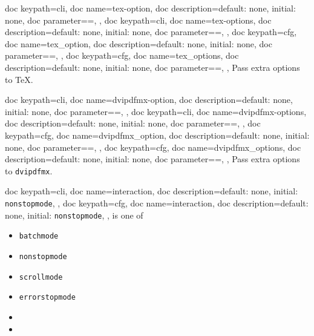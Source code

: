 \documentclass[a4paper, 11pt]{scrartcl}
\let\TeXold\TeX
\renewcommand\TeX{\TeXold\xspace}
\begin{document}
\begin{docKeys}{
		{
			doc keypath=cli,
			doc name=tex-option,
			doc description={default: none, initial: none},
			doc parameter={=},
		},
		{
			doc keypath=cli,
			doc name=tex-options,
			doc description={default: none, initial: none},
			doc parameter={=},
		},
		{
			doc keypath=cfg,
			doc name=tex_option,
			doc description={default: none, initial: none},
			doc parameter={=},
		},
		{
			doc keypath=cfg,
			doc name=tex_options,
			doc description={default: none, initial: none},
			doc parameter={=},
		},
	}
	Pass extra options to \TeX.
\end{docKeys}
\begin{docKeys}{
		{
			doc keypath=cli,
			doc name=dvipdfmx-option,
			doc description={default: none, initial: none},
			doc parameter={=},
		},
		{
			doc keypath=cli,
			doc name=dvipdfmx-options,
			doc description={default: none, initial: none},
			doc parameter={=},
		},
		{
			doc keypath=cfg,
			doc name=dvipdfmx_option,
			doc description={default: none, initial: none},
			doc parameter={=},
		},
		{
			doc keypath=cfg,
			doc name=dvipdfmx_options,
			doc description={default: none, initial: none},
			doc parameter={=},
		},
	}
	Pass extra options to \texttt{dvipdfmx}.
\end{docKeys}
\begin{docKeys}[
		doc parameter={=\meta{interaction}},
	]{
		{
			doc keypath=cli,
			doc name=interaction,
			doc description={default: none, initial: \texttt{nonstopmode}},
		},
		{
			doc keypath=cfg,
			doc name=interaction,
			doc description={default: none, initial: \texttt{nonstopmode}},
		},
	}
	 is one of
	\begin{multicols}{3}
		\begin{itemize}
			\item \texttt{batchmode}
			\item \texttt{nonstopmode}
			\item \texttt{scrollmode}
			\item \texttt{errorstopmode}
			\item[]
			\item[]
		\end{itemize}
	\end{multicols}
\end{docKeys}
\end{document}
